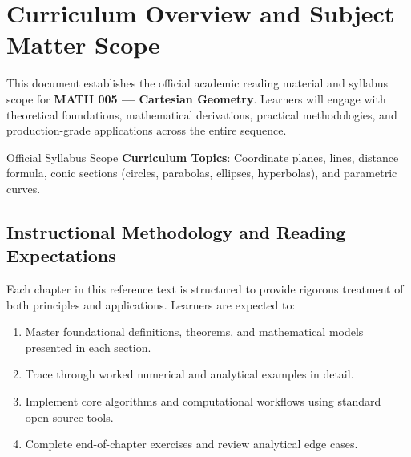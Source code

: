 \section{Curriculum Overview and Subject Matter Scope}

This document establishes the official academic reading material and syllabus scope for \textbf{MATH 005 --- Cartesian Geometry}. Learners will engage with theoretical foundations, mathematical derivations, practical methodologies, and production-grade applications across the entire sequence.

\begin{InsightBox}{Official Syllabus Scope}
  \textbf{Curriculum Topics}: Coordinate planes, lines, distance formula, conic sections (circles, parabolas, ellipses, hyperbolas), and parametric curves.
\end{InsightBox}

\subsection{Instructional Methodology and Reading Expectations}

Each chapter in this reference text is structured to provide rigorous treatment of both principles and applications. Learners are expected to:
\begin{enumerate}
  \item Master foundational definitions, theorems, and mathematical models presented in each section.
  \item Trace through worked numerical and analytical examples in detail.
  \item Implement core algorithms and computational workflows using standard open-source tools.
  \item Complete end-of-chapter exercises and review analytical edge cases.
\end{enumerate}

